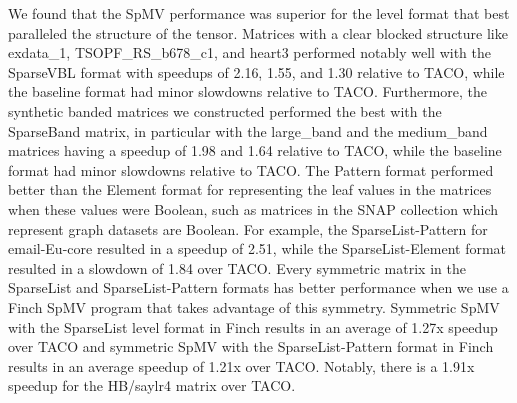  We found that the SpMV performance was superior for the level format that best paralleled the structure of the tensor.
  Matrices with a clear blocked structure like exdata\_1, TSOPF\_RS\_b678\_c1, and heart3 performed notably well with the SparseVBL format with speedups of 2.16, 1.55, and 1.30 relative to TACO, while the baseline format had minor slowdowns relative to TACO.
  Furthermore, the synthetic banded matrices we constructed performed the best with the SparseBand matrix, in particular with the large\_band and the medium\_band matrices having a speedup of 1.98 and 1.64 relative to TACO, while the baseline format had minor slowdowns relative to TACO.
  The Pattern format performed better than the Element format for representing the leaf values in the matrices when these values were Boolean, such as matrices in the SNAP collection which represent graph datasets are Boolean. 
  For example, the SparseList-Pattern for email-Eu-core resulted in a speedup of 2.51, while the SparseList-Element format resulted in a slowdown of 1.84 over TACO.
  Every symmetric matrix in the SparseList and SparseList-Pattern formats has better performance when we use a Finch SpMV program that takes advantage of this symmetry.
  Symmetric SpMV with the SparseList level format in Finch results in an average of 1.27x speedup over TACO and symmetric SpMV with the SparseList-Pattern format in Finch results in an average speedup of 1.21x over TACO.
  Notably, there is a 1.91x speedup for the HB/saylr4 matrix over TACO. 
  
  
  
  
  
  
